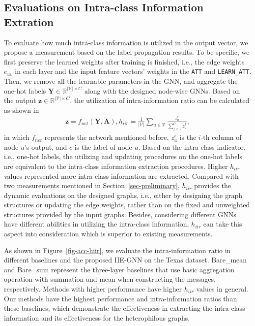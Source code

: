 \documentclass[sigconf]{acmart}
\def\bA{\textbf{A}}
\def\bz{\textbf{z}}
\begin{document}
\subsection{Evaluations on Intra-class Information Extration}
To evaluate how much intra-class information is utilized in the output vector, we propose a measurement based on the label propagation results.
To be specific, we first preserve the learned weights after training is finished, i.e., the edge weights $e_{uv}$ in each layer and the input feature vectors' weights in the \texttt{ATT} and \texttt{LEARN\_ATT}. Then, we remove all the learnable parameters in the GNN, and aggregate the one-hot labels $\textbf{Y} \in \mathbb{R}^{|\mathcal{V}|\times C}$ along with the designed node-wise GNNs.
Based on the output $\bz \in \mathbb{R}^{|\mathcal{V}|\times C}$, the utilization of intra-information ratio can be calculated as shown in
\begin{align}
	\bz = f_{net}(\textbf{Y}, \bA),
	h_{iir} = \frac{1}{|\mathcal{V}|}\sum_{u \in \mathcal{V}}\frac{z_u^c}{\sum_{j=1}^C z_u^j},
\end{align}
in which $f_{net}$ represents the network mentioned before, $z_u^i$ is the $i$-th column of node $u$'s output, and $c$ is the label of node $u$. 
Based on the intra-class indicator, i.e., one-hot labels, the utilizing and updating procedures on the one-hot labels are equivalent to the intra-class information extraction procedures.
Higher $h_{iir}$ values represented more intra-class information are extracted.
Compared with two measurements mentioned in Section~\ref{sec-preliminary}, $h_{iir}$ provides the dynamic evaluations on the designed graphs, i.e., either by designing the graph structures or updating the edge weights, rather than on the fixed and unweighted structures provided by the input graphs. 
Besides, considering different GNNs have different abilities in utilizing the intra-class information, $h_{iir}$ can take this aspect into consideration which is superior to existing measurements.

As shown in Figure~\ref{fig-acc-hiir}, we evaluate the intra-information ratio in different baselines and the proposed IIE-GNN on the Texas dataset. Bare\_mean and Bare\_sum represent the three-layer baselines that use basic aggregation operation with summation and mean when constructing the messages, respectively.
Methods with higher performance have higher $h_{iir}$ values in general. 
Our methods have the highest performance and intra-information ratios than these baselines, which demonstrate the effectiveness in extracting the intra-class information and its effectiveness for the heterophilous graphs. 
\end{document}
